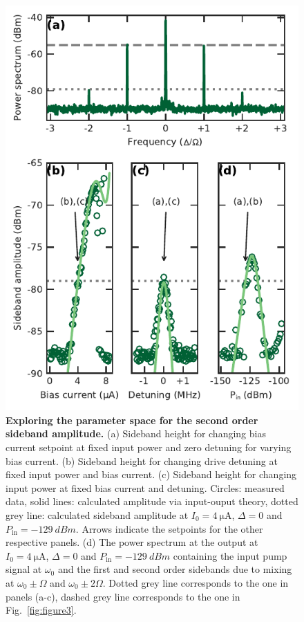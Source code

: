 \begin{figure}[t]
	\centering
	\includegraphics[width=.5\linewidth]{chapter-currentdetection/figures/SM_second_order_peak}
	\caption{
		\textbf{Exploring the parameter space for the second order sideband amplitude.}
		(a) Sideband height for changing bias current setpoint at fixed input power and zero detuning for varying bias current.
		(b) Sideband height for changing drive detuning at fixed input power and bias current.
		(c) Sideband height for changing input power at fixed bias current and detuning.
		Circles: measured data, solid lines: calculated amplitude via input-ouput theory, dotted grey line: calculated sideband amplitude at $I_0=\SI{4}{\micro\ampere}$, $\Delta=0$ and $P_\text{in}=\SI{-129}{dBm}$.
		Arrows indicate the setpoints for the other respective panels.
		(d) The power spectrum at the output at $I_0=\SI{4}{\micro\ampere}$, $\Delta=0$ and $P_\text{in}=\SI{-129}{dBm}$ containing the input pump signal at $\omega_0$ and the first and second order sidebands due to mixing at $\omega_0 \pm \Omega$ and $\omega_0 \pm 2\Omega$.
		Dotted grey line corresponds to the one in panels (a-c), dashed grey line corresponds to the one in Fig.~\ref{fig:figure3}.
	}
	\label{fig:higher-order-peaks}
\end{figure}


%



\clearpage
\pagebreak


